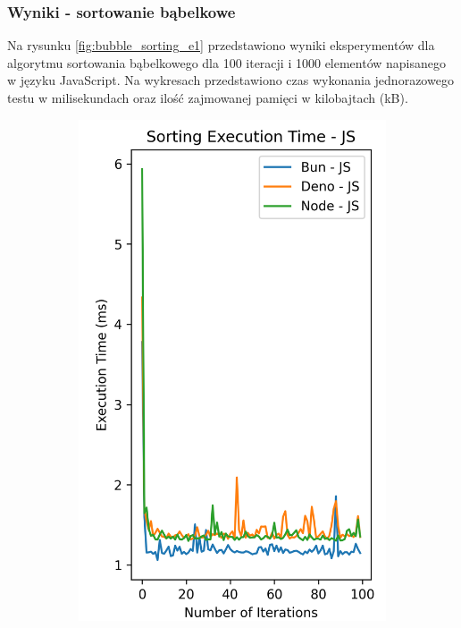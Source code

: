 \subsubsection{Wyniki - sortowanie bąbelkowe}
Na rysunku \ref{fig:bubble_sorting_e1} przedstawiono wyniki eksperymentów dla algorytmu sortowania bąbelkowego dla 100 iteracji i 1000 elementów napisanego w języku JavaScript. Na wykresach przedstawiono czas wykonania jednorazowego testu w milisekundach oraz ilość zajmowanej pamięci w kilobajtach (kB).

\begin{figure}[H]
  \centering
  \begin{subfigure}[b]{0.42\textwidth}
    \centering
    \includegraphics[width=\textwidth]{Figures/sorting/sorting_bubble_100_1000_js_time.png}

\end{subfigure}
\end{figure}
